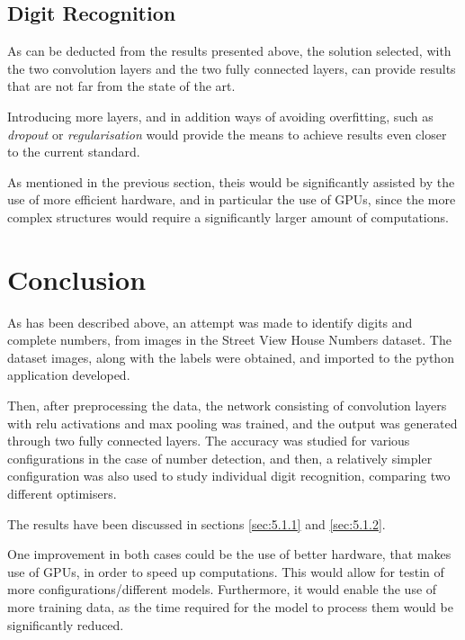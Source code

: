\documentclass[final,12p,times]{elsarticle}
\begin{document}
\subsection{Digit Recognition}
\label{sec:6.2}
As can be deducted from the results presented above, the solution selected, with the two convolution layers and the 
two fully connected layers, can provide results that are not far from the state of the art.

Introducing more layers, and in addition ways of avoiding overfitting, such as \emph{dropout} or \emph{regularisation}
would provide the means to achieve results even closer to the current standard.

As mentioned in the previous section, theis would be significantly assisted by the use of more efficient hardware,
and in particular the use of GPUs, since the more complex structures would require a significantly larger amount of computations.


\section{Conclusion}
\label{sec:6.3}
As has been described above, an attempt was made to identify digits and complete numbers, from images in the Street View House 
Numbers dataset.
The dataset images, along with the labels were obtained, and imported to the python application developed.

Then, after preprocessing the data, the network consisting of convolution layers with relu activations and max pooling was trained, and the output was generated 
through two fully connected layers.
The accuracy was studied for various configurations in the case of number detection, and then, a relatively simpler configuration 
was also used to study individual digit recognition, comparing two different optimisers.

The results have been discussed in sections \ref{sec:5.1.1} and \ref{sec:5.1.2}.

One improvement in both cases could be the use of better hardware, that makes use of GPUs, in order to speed up computations.
This would allow for testin of more configurations/different models.
Furthermore, it would enable the use of more training data, as the time required for the model to process them would be significantly reduced.
\end{document}

